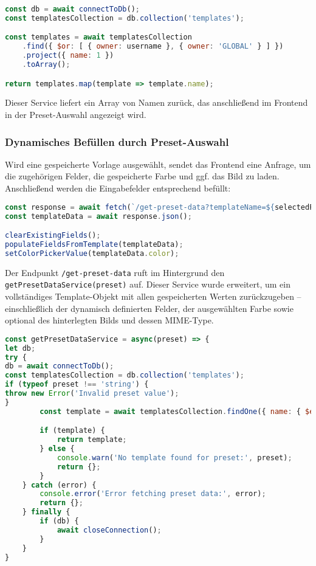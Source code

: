 \begin{lstlisting}[language=JavaScript, caption=Service zum Abrufen von Template-Namen]
const db = await connectToDb();
const templatesCollection = db.collection('templates');

const templates = await templatesCollection
    .find({ $or: [ { owner: username }, { owner: 'GLOBAL' } ] })
    .project({ name: 1 })
    .toArray();

return templates.map(template => template.name);
\end{lstlisting}

Dieser Service liefert ein Array von Namen zurück, das anschließend im Frontend in der Preset-Auswahl angezeigt wird.

\subsubsection{Dynamisches Befüllen durch Preset-Auswahl}\label{subsubsec:load-template-data}

Wird eine gespeicherte Vorlage ausgewählt, sendet das Frontend eine Anfrage, um die zugehörigen Felder, die gespeicherte Farbe und ggf. das Bild zu laden.
Anschließend werden die Eingabefelder entsprechend befüllt:

\begin{lstlisting}[language=JavaScript, caption=Preset-Auswahl lädt Felder und Bild]
const response = await fetch(`/get-preset-data?templateName=${selectedPreset}`);
const templateData = await response.json();

clearExistingFields();
populateFieldsFromTemplate(templateData);
setColorPickerValue(templateData.color);
\end{lstlisting}

Der Endpunkt \texttt{/get-preset-data} ruft im Hintergrund den \texttt{getPresetDataService(preset)} auf.
Dieser Service wurde erweitert, um ein vollständiges Template-Objekt mit allen gespeicherten Werten zurückzugeben – einschließlich der dynamisch definierten Felder, der ausgewählten Farbe sowie optional des hinterlegten Bilds und dessen MIME-Type.

\begin{lstlisting}[language=JavaScript, caption=Service zum Laden eines Templates]
const getPresetDataService = async(preset) => {
let db;
try {
db = await connectToDb();
const templatesCollection = db.collection('templates');
if (typeof preset !== 'string') {
throw new Error('Invalid preset value');
}
        const template = await templatesCollection.findOne({ name: { $eq: preset } });

        if (template) {
            return template;
        } else {
            console.warn('No template found for preset:', preset);
            return {};
        }
    } catch (error) {
        console.error('Error fetching preset data:', error);
        return {};
    } finally {
        if (db) {
            await closeConnection();
        }
    }
}
\end{lstlisting}

